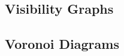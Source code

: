 \subsection{Visibility Graphs}
\label{cha::lit::graphs::vis}

\subsection{Voronoi Diagrams}
\label{cha::lit::graphs::voronoi}

